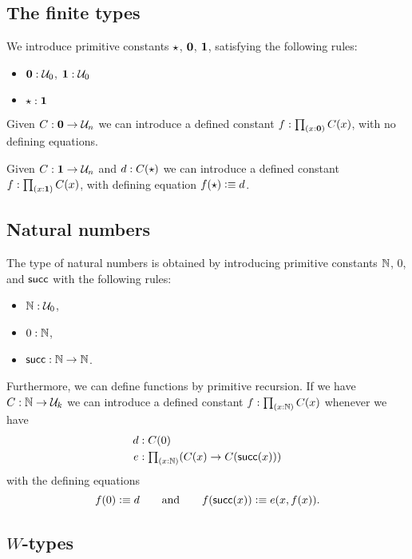 \documentclass[hott-all.tex]{subfiles}
\begin{document}
\subsection{The finite types}

We introduce primitive constants $\star$, $\mathbf{0}$, $\mathbf{1}$, satisfying the following rules:
%
\begin{itemize}
\item $\mathbf{0} : \mathcal{U}_0$, $\mathbf{1} : \mathcal{U}_0$
\item $\star:\mathbf{1}$
\end{itemize}

Given $C : \mathbf{0} \rightarrow \mathcal{U}_n$ we can introduce a defined constant $f:\tprd{x:\emptyt} C(x)$, with no defining equations.

Given $C : \mathbf{1} \rightarrow \mathcal{U}_n$ and $d : C(\star)$ we can introduce a defined constant $f:\tprd{x:\unit} C(x)$, with defining equation $f(\star) \vcentcolon\equiv d$.

\subsection{Natural numbers}

The type of natural numbers is obtained by introducing primitive constants
$\mathbb{N}$, $0$, and $\mathsf{succ}$ with the following rules:
%
\begin{itemize}
  \item $\mathbb{N} : \mathcal{U}_0$,
  \item $0:\mathbb{N}$,
  \item $\mathsf{succ}:\mathbb{N}\rightarrow \mathbb{N}$.
\end{itemize}
%
Furthermore, we can define functions by primitive recursion. If we have
$C : \mathbb{N} \rightarrow \mathcal{U}_k $ we can introduce a defined constant $f:\tprd{x:\N}C(x)$ whenever we have
%
\begin{align*}
  d & : C(0) \\
  e & : \tprd{x:\N}(C(x)\rightarrow C(\suc (x)))
\end{align*}
%
with the defining equations
%
\begin{equation*}
  f(0) \vcentcolon\equiv d
  \qquad\text{and}\qquad
  f(\mathsf{succ} (x)) \vcentcolon\equiv e(x,f(x)).
\end{equation*}

\subsection{\texorpdfstring{$W$}{W}-types}
\end{document}
